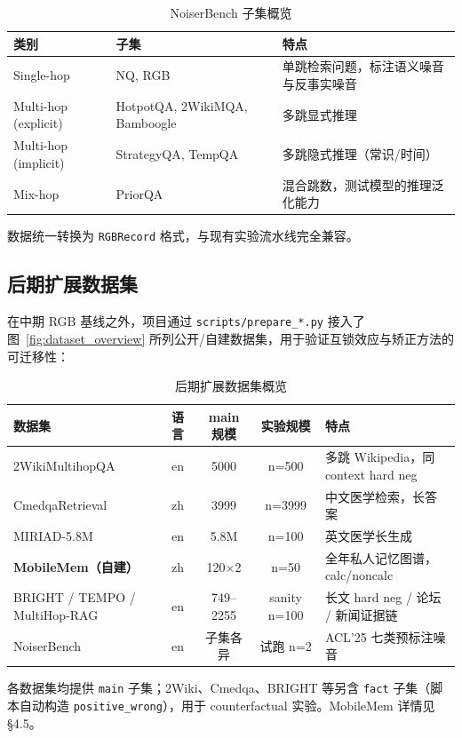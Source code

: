 \documentclass[UTF8,zihao=-4]{ctexart}
\begin{document}
\begin{table}[H]
  \centering
  \caption{NoiserBench 子集概览}
  \begin{tabularx}{\textwidth}{llY}
    \toprule
    类别 & 子集 & 特点 \\
    \midrule
    Single-hop & NQ, RGB & 单跳检索问题，标注语义噪音与反事实噪音 \\
    Multi-hop (explicit) & HotpotQA, 2WikiMQA, Bamboogle & 多跳显式推理 \\
    Multi-hop (implicit) & StrategyQA, TempQA & 多跳隐式推理（常识/时间） \\
    Mix-hop & PriorQA & 混合跳数，测试模型的推理泛化能力 \\
    \bottomrule
  \end{tabularx}
\end{table}

数据统一转换为 \texttt{RGBRecord} 格式，与现有实验流水线完全兼容。

\subsection{后期扩展数据集}
在中期 RGB 基线之外，项目通过 \texttt{scripts/prepare\_*.py} 接入了图~\ref{fig:dataset_overview} 所列公开/自建数据集，用于验证互锁效应与矫正方法的可迁移性：

\begin{table}[H]
  \centering
  \caption{后期扩展数据集概览}
  \begin{tabularx}{\textwidth}{llccY}
    \toprule
    数据集 & 语言 & main 规模 & 实验规模 & 特点 \\
    \midrule
    2WikiMultihopQA & en & 5000 & n=500 & 多跳 Wikipedia，同 context hard neg \\
    CmedqaRetrieval & zh & 3999 & n=3999 & 中文医学检索，长答案 \\
    MIRIAD-5.8M & en & 5.8M & n=100 & 英文医学长生成 \\
    \textbf{MobileMem（自建）} & zh & 120×2 & n=50 & 全年私人记忆图谱，calc/noncalc \\
    BRIGHT / TEMPO / MultiHop-RAG & en & 749--2255 & sanity n=100 & 长文 hard neg / 论坛 / 新闻证据链 \\
    NoiserBench & en & 子集各异 & 试跑 n=2 & ACL'25 七类预标注噪音 \\
    \bottomrule
  \end{tabularx}
\end{table}

各数据集均提供 \texttt{main} 子集；2Wiki、Cmedqa、BRIGHT 等另含 \texttt{fact} 子集（脚本自动构造 \texttt{positive\_wrong}），用于 counterfactual 实验。MobileMem 详情见 §4.5。
\end{document}
